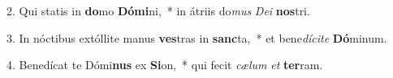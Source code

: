 2. Qui statis in \textbf{do}mo \textbf{Dó}\textbf{mi}ni,~*  in átriis do\textit{mus} \textit{De}\textit{i} \textbf{nos}tri.\

3. In nóctibus extóllite manus \textbf{ves}tras in \textbf{sanc}ta,~*  et bene\textit{dí}\textit{ci}\textit{te} \textbf{Dó}minum.\

4. Benedícat te Dómi\textbf{nus} ex \textbf{Si}on,~*  qui fecit \textit{cæ}\textit{lum} \textit{et} \textbf{ter}ram.\

